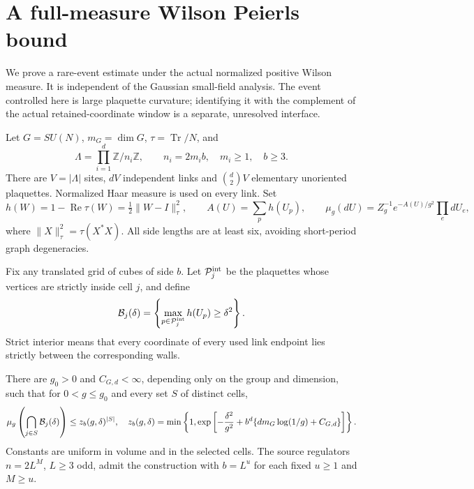 \section{A full-measure Wilson Peierls bound}
\label{fwp-section}

We prove a rare-event estimate under the actual normalized positive
Wilson measure. It is independent of the Gaussian small-field analysis.
The event controlled here is large plaquette curvature; identifying it
with the complement of the actual retained-coordinate window is a
separate, unresolved interface.

Let \(G=SU(N)\), \(m_G=\dim G\), \(\tau=\operatorname{Tr}/N\), and
\[
 \Lambda=\prod_{i=1}^d\mathbb Z/n_i\mathbb Z,\qquad
 n_i=2m_i b,\quad m_i\ge1,\quad b\ge3.
\]
There are \(V=|\Lambda|\) sites, \(dV\) independent links and
\(\binom d2V\) elementary unoriented plaquettes. Normalized Haar measure
is used on every link. Set
\begin{equation}
 h(W)=1-\operatorname{Re}\tau(W)
       =\tfrac12\|W-I\|_\tau^2,\qquad
 A(U)=\sum_p h(U_p),\qquad
 \mu_g(dU)=Z_g^{-1}e^{-A(U)/g^2}\prod_e dU_e,
 \label{fwp-measure}
\end{equation}
where \(\|X\|_\tau^2=\tau(X^*X)\).
All side lengths are at least six, avoiding short-period graph
degeneracies.

Fix any translated grid of cubes of side \(b\).
Let \({\cal P}_j^{\rm int}\) be the plaquettes whose vertices are strictly
inside cell \(j\), and define
\begin{equation}
 {\cal B}_j(\delta)
 =\left\{\max_{p\in{\cal P}_j^{\rm int}}h(U_p)\ge\delta^2\right\}.
 \label{fwp-event}
\end{equation}
Strict interior means that every coordinate of every used link endpoint
lies strictly between the corresponding walls.

\begin{theorem}
\label{fwp-main}
There are \(g_0>0\) and \(C_{G,d}<\infty\), depending only on the group
and dimension, such that for \(0<g\le g_0\) and every set \(S\) of
distinct cells,
\begin{equation}
 \mu_g\left(\bigcap_{j\in S}{\cal B}_j(\delta)\right)
 \le z_b(g,\delta)^{|S|},
 \quad
 z_b(g,\delta)=
 \min\left\{1,
 \exp\left[-\frac{\delta^2}{g^2}
     +b^d\{d m_G\log(1/g)+C_{G,d}\}\right]\right\}.
 \label{fwp-main-bound}
\end{equation}
Constants are uniform in volume and in the selected cells. The source
regulators \(n=2L^M\), \(L\ge3\) odd, admit the construction with
\(b=L^u\) for each fixed \(u\ge1\) and \(M\ge u\).
\end{theorem}


